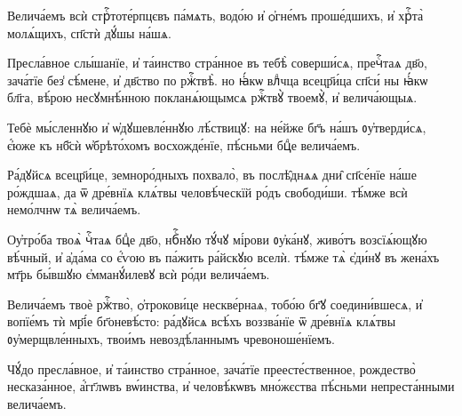 \hKv Велича́емъ всѝ стрⷭ҇тоте́рпцєвъ па́мѧть, водо́ю и҆  ѻ҆гне́мъ проше́дшихъ, и҆ хрⷭ҇та̀ молѧ́щихъ, сп҃стѝ дꙋ́шы  на́шѧ. 

\hKv Пресла́вное слы́шанїе, и҆ та́инство стра́нное въ тебѣ̀  соверши́сѧ, пречⷭ҇таѧ дв҃о, зача́тїе без̾ сѣ́мене, и҆  дв҃ство по ржⷭ҇твѣ̀. но ꙗ҆́кѡ влⷣчца всецр҃и́ца сп҃си́ ны  ꙗ҆́кѡ бл҃га, вѣ́рою несꙋмнѣ́нною покланѧ́ющымсѧ ржⷭ҇твꙋ̀  твоемꙋ̀, и҆ велича́ющыѧ. 

\hKv Тебѐ мы́сленнꙋю и҆ ѡ҆дꙋшевле́ннꙋю лѣ́ствицꙋ: на не́йже  бг҃ъ на́шъ ᲂу҆тверди́сѧ, є҆́юже къ нб҃сѝ ѡ҆брѣто́хомъ  восхожде́нїе, пѣ́сньми бцⷣе велича́емъ.  

\hKv Ра́дꙋйсѧ всецр҃и́це, земноро́дныхъ похвало̀, въ послѣ̑днѧѧ  дни̑ сп҃се́нїе на́ше ро́ждшаѧ, да ѿ дре́внїѧ клѧ́твы  человѣ́ческїй ро́дъ свободи́ши. тѣ́мже всѝ немо́лчнѡ тѧ̀  велича́емъ. 

\hKv Оу҆тро́ба твоѧ̀ чⷭ҇таѧ бцⷣе дв҃о, нбⷭ҇нꙋю тꙋ́чꙋ мі́рови  ᲂу҆ка́нꙋ, живо́тъ возсїѧ́ющꙋю вѣ́чный, и҆ а҆да́ма со  є҆́ѵою въ па́жить ра́йскꙋю вселѝ. тѣ́мже тѧ̀ є҆ди́нꙋ въ  жена́хъ мт҃рь бы́вшꙋю є҆мманꙋ́илевꙋ всѝ ро́ди велича́емъ. 

\hKv Велича́емъ твоѐ ржⷭ҇тво̀, ѻ҆трокови́це нескве́рнаѧ, тобо́ю  бг҃ꙋ соедини́вшесѧ, и҆ вопїе́мъ тѝ мр҃і́е бг҃оневѣ́сто:  ра́дꙋйсѧ всѣ́хъ воззва́нїе ѿ дре́внїѧ клѧ́твы  ᲂу҆мерщвле́нныхъ, твои́мъ невоздѣ́ланнымъ чревоноше́нїемъ. 

\hKv Чꙋ́до пресла́вное, и҆ та́инство стра́нное, зача́тїе  преесте́ственное, рождество̀ несказа́нное, а҆́гг҃лѡвъ  вѡ́инства, и҆ человѣ́кѡвъ мно́жєства пѣ́сньми  непреста́нными велича́емъ.  


